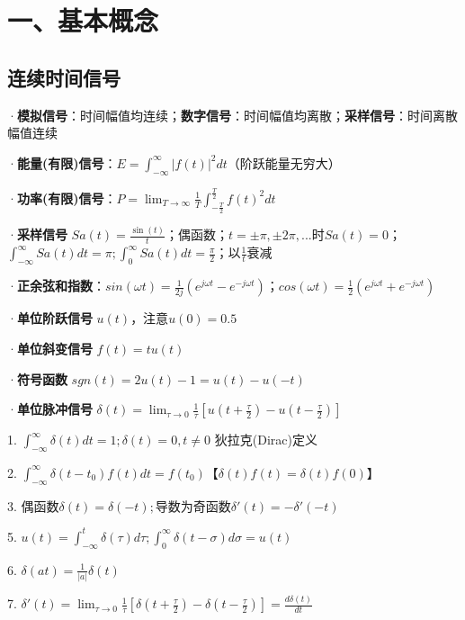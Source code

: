 \setlength{\tabcolsep}{1pt} %
\setlength{\topsep}{1pt}
\setlength{\partopsep}{1pt}
\setlength{\parskip}{1pt}

\section*{一、基本概念}

\subsection*{连续时间信号}

·\textbf{模拟信号}：时间幅值均连续；\textbf{数字信号}：时间幅值均离散；\textbf{采样信号}：时间离散幅值连续

·\textbf{能量(有限)信号}：$E= \int ^{\infty} _{-\infty} |f(t)|^2dt$（阶跃能量无穷大）

·\textbf{功率(有限)信号}：$P = \lim_{T\to\infty} \frac{1}{T} \int ^{\frac{T}{2}} _{-\frac{T}{2}} f(t)^2dt$

·\textbf{采样信号} $Sa(t) = \frac{\sin(t)}{t}$；偶函数；$t = \pm \pi, \pm 2 \pi, ...$时$Sa(t)=0$；
   $\int ^{\infty} _{-\infty} Sa(t)dt = \pi;\int ^{\infty} _{0} Sa(t)dt = \frac{\pi}{2}$；以$\frac{1}{t}$衰减

·\textbf{正余弦和指数}：$sin(\omega t)=\frac{1}{2j}(e^{j\omega t}-e^{-j\omega t})$；$cos(\omega t)=\frac{1}{2}(e^{j\omega t}+e^{-j\omega t})$

·\textbf{单位阶跃信号} $u(t)$，注意$u(0)=0.5$

·\textbf{单位斜变信号} $f(t) = tu(t)$

·\textbf{符号函数} $sgn(t) = 2u(t) - 1 = u(t) - u(-t)$

·\textbf{单位脉冲信号} $\delta (t) = \lim_{\tau\to0}\frac{1}{\tau}[u(t+\frac{\tau}{2})-u(t-\frac{\tau}{2})]$
   
   1. $\int ^{\infty} _{-\infty} \delta (t)dt = 1; \delta (t) = 0, t \ne 0$ 狄拉克(Dirac)定义
   
   2. $\int ^{\infty} _{-\infty} \delta (t-t_0)f(t)dt = f(t_0)$【$\delta (t)f(t) = \delta(t)f(0)$】
   
   3. 偶函数$\delta(t) = \delta(-t);$导数为奇函数$\delta'(t) = -\delta'(-t)$
   
   5. $u(t)=\int ^t _{-\infty} \delta(\tau)d\tau; \int ^{\infty} _{0} \delta(t-\sigma)d\sigma = u(t)$
   
   6. $\delta(at) = \frac{1}{|a|}\delta(t)$
   
   7. $\delta'(t)=\lim_{\tau\to0}\frac{1}{\tau}[\delta(t+\frac{\tau}{2})-\delta(t-\frac{\tau}{2})]=\frac{d\delta(t)}{dt}$ 
   
